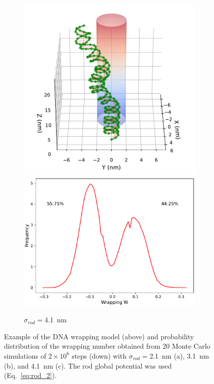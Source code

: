 \documentclass[a4paper,10pt]{article}
\begin{document}
\begin{figure}[htbp]
\begin{subfigure}{.3\textwidth}
\includegraphics[width=\textwidth]{r2_C_2000000_18.pdf}
\includegraphics[width=\textwidth]{r2_C_wr_pr.pdf}
\caption{$\sigma_{rod}=$\SI{4.1}{\nm}}
\label{fig:r2_c}
\end{subfigure}
\caption{Example of the DNA wrapping model (above) and probability distribution of the wrapping number obtained from $20$ Monte Carlo simulations of $2\times 10^6$ steps (down) with $\sigma_{rod}=$\SI{2.1}{\nm} (a), \SI{3.1}{\nm} (b), and \SI{4.1}{\nm} (c). The rod global potential was used (Eq.~\ref{eq:rod_2}).}
\label{fig:r2}
\end{figure}
\end{document}
